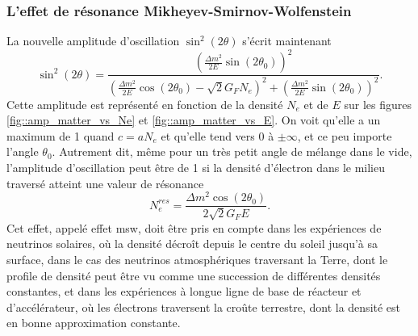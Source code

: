             \subsubsection{L'effet de résonance Mikheyev-Smirnov-Wolfenstein}
            La nouvelle amplitude d'oscillation $\sin^2(2\theta)$ s'écrit maintenant
            \begin{equation}
                \sin^2(2\theta) = \frac{\left(\frac{\Delta m^2}{2E}\sin(2\theta_0)\right)^2}{\left(\frac{\Delta m^2}{2E}\cos(2\theta_0) - \sqrt{2}G_F N_e\right)^2 + \left(\frac{\Delta m^2}{2E}\sin(2\theta_0)\right)^2}.
            \end{equation}
            Cette amplitude est représenté en fonction de la densité $N_e$ et de $E$ sur les figures \ref{fig::amp_matter_vs_Ne} et \ref{fig::amp_matter_vs_E}. On voit qu'elle a un maximum de 1 quand $c = a N_e$ et qu'elle tend vers 0 à $\pm\infty$, et ce peu importe l'angle $\theta_0$. Autrement dit, même pour un très petit angle de mélange dans le vide, l'amplitude d'oscillation peut être de 1 si la densité d'électron dans le milieu traversé atteint une valeur de résonance
            \begin{equation}\label{eq::MSW_condition}
                N_e^{res}=\frac{\Delta m^2\cos(2\theta_0)}{2\sqrt{2}G_F E}.%
            \end{equation}
            Cet effet, appelé effet \gls{msw}, doit être pris en compte dans les expériences de neutrinos solaires, où la densité décroît depuis le centre du soleil jusqu'à sa surface, dans le cas des neutrinos atmosphériques traversant la Terre, dont le profile de densité peut être vu comme une succession de différentes densités constantes, et dans les expériences à longue ligne de base de réacteur et d'accélérateur, où les électrons traversent la croûte terrestre, dont la densité est en bonne approximation constante.
            
            
